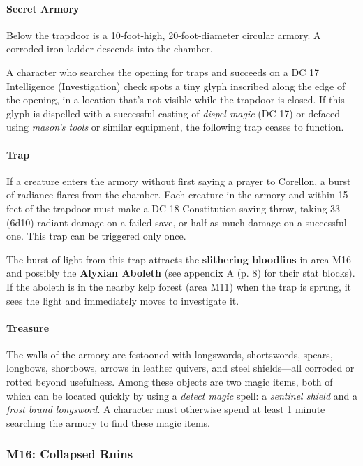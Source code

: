 \documentclass[letterpaper, 11pt, bg=full, twocolumn]{dndbook}
\begin{document}
\paragraph{Secret Armory}

Below the trapdoor is a 10-foot-high, 20-foot-diameter circular armory. A corroded iron ladder descends into the chamber.

A character who searches the opening for traps and succeeds on a DC 17 Intelligence (Investigation) check spots a tiny glyph inscribed along the edge of the opening, in a location that's not visible while the trapdoor is closed. If this glyph is dispelled with a successful casting of \textit{dispel magic} (DC 17) or defaced using \textit{mason's tools} or similar equipment, the following trap ceases to function.

\paragraph{Trap}

If a creature enters the armory without first saying a prayer to Corellon, a burst of radiance flares from the chamber. Each creature in the armory and within 15 feet of the trapdoor must make a DC 18 Constitution saving throw, taking 33 (6d10) radiant damage on a failed save, or half as much damage on a successful one. This trap can be triggered only once.

The burst of light from this trap attracts the \textbf{slithering bloodfins} in area M16 and possibly the \textbf{Alyxian Aboleth} (see appendix A (p. 8) for their stat blocks). If the aboleth is in the nearby kelp forest (area M11) when the trap is sprung, it sees the light and immediately moves to investigate it.

\paragraph{Treasure}

The walls of the armory are festooned with longswords, shortswords, spears, longbows, shortbows, arrows in leather quivers, and steel shields---all corroded or rotted beyond usefulness. Among these objects are two magic items, both of which can be located quickly by using a \textit{detect magic} spell: a \textit{sentinel shield} and a \textit{frost brand longsword}. A character must otherwise spend at least 1 minute searching the armory to find these magic items.

\subsubsection{M16: Collapsed Ruins}
\end{document}
